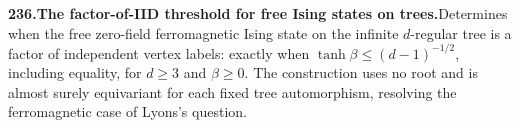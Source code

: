 \documentclass[11pt,a4paper]{article}
\begin{document}
  \par \begin{minipage}{\linewidth}
  \fontsize{10.5}{12.6}\selectfont\RaggedRight
  \hypertarget{result 236}{}
  {\bfseries\textcolor{muted}{236.}\enspace The factor-of-IID threshold for free Ising states on trees.}\enspace Determines when the free zero-field ferromagnetic Ising state on the infinite $d$-regular tree is a factor of independent vertex labels: exactly when $\tanh\beta\le(d-1)^{-1/2}$, including equality, for $d\ge3$ and $\beta\ge0$. The construction uses no root and is almost surely equivariant for each fixed tree automorphism, resolving the ferromagnetic case of Lyons's question.\par
  \end{minipage}\par\vspace{5pt}
\end{document}
